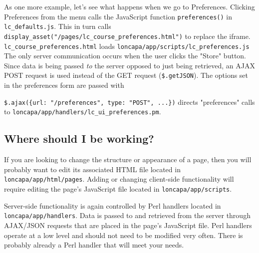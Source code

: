 As one more example, let's see what happens when we go to Preferences.  Clicking Preferences from the menu calls the JavaScript function {\tt preferences()} in {\tt lc\_defaults.js}.  This in turn calls {\tt display\_asset("/pages/lc\_course\_preferences.html")} to replace the iframe.  {\tt lc\_course\_preferences.html} loads {\tt loncapa/app/scripts/lc\_preferences.js}  The only server communication occurs when the user clicks the "Store" button.  Since data is being passed {\it to} the server opposed to just being retrieved, an AJAX POST request is used instead of the GET request ({\tt \$.getJSON}).  The options set in the preferences form are passed with 

{\tt \$.ajax(\{url: "/preferences", type: "POST", ...\})}  directs "preferences" calls to {\tt loncapa/app/handlers/lc\_ui\_preferences.pm}.


\subsection{Where should I be working?}
If you are looking to change the structure or appearance of a page, then you will probably want to edit its associated HTML file located in {\tt loncapa/app/html/pages}.  Adding or changing client-side functionality will require editing the page's JavaScript file located in {\tt loncapa/app/scripts}.

Server-side functionality is again controlled by Perl handlers located in {\tt loncapa/app/handlers}.  Data is passed to and retrieved from the server through AJAX/JSON requests that are placed in the page's JavaScript file.  Perl handlers operate at a low level and should not need to be modified very often.  There is probably already a Perl handler that will meet your needs.




